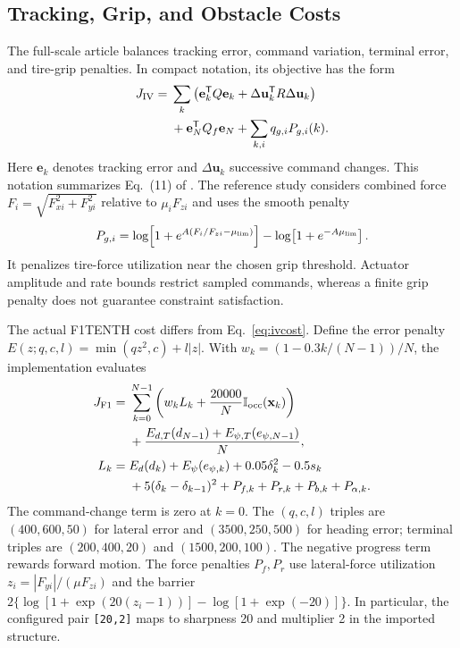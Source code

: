 \subsection{Tracking, Grip, and Obstacle Costs}
The full-scale article balances tracking error, command variation, terminal error, and tire-grip penalties. In compact notation, its objective has the form
\begin{equation}
\begin{aligned}
J_{\rm IV}={}&\sum_k\left(\mathbf e_k^\mathsf TQ\mathbf e_k+
\Delta\mathbf u_k^\mathsf TR\Delta\mathbf u_k\right)\\
&+\mathbf e_N^\mathsf TQ_f\mathbf e_N
 +\sum_{k,i}q_{g,i}P_{g,i}(k).
\end{aligned}\label{eq:ivcost}
\end{equation}
Here $\mathbf e_k$ denotes tracking error and $\Delta\mathbf u_k$ successive command changes. This notation summarizes Eq.~(11) of \cite{muraleedharan2025racing}. The reference study considers combined force $F_i=\sqrt{F_{xi}^2+F_{yi}^2}$ relative to $\mu_iF_{zi}$ and uses the smooth penalty
\begin{equation}
P_{g,i}=\log\!\left[1+e^{A(F_i/F_{zi}-\mu_{\rm lim})}\right]
-\log\!\left[1+e^{-A\mu_{\rm lim}}\right].
\end{equation}
It penalizes tire-force utilization near the chosen grip threshold. Actuator amplitude and rate bounds restrict sampled commands, whereas a finite grip penalty does not guarantee constraint satisfaction.

The actual F1TENTH cost differs from Eq.~\ref{eq:ivcost}. Define the error penalty $E(z;q,c,l)=\min(qz^2,c)+l|z|$. With $w_k=(1-0.3k/(N-1))/N$, the implementation evaluates
\begin{equation}
\begin{aligned}
J_{\rm F1}={}&\sum_{k=0}^{N-1}\left(w_kL_k+
\frac{20000}{N}\mathbb I_{\rm occ}(\mathbf x_k)\right)\\
&+\frac{E_{d,T}(d_{N-1})+E_{\psi,T}(e_{\psi,N-1})}{N},\\
L_k={}&E_d(d_k)+E_\psi(e_{\psi,k})+0.05\delta_k^2-0.5s_k\\
&+5(\delta_k-\delta_{k-1})^2
 +P_{f,k}+P_{r,k}+P_{b,k}+P_{\alpha,k}.
\end{aligned}\label{eq:f1cost}
\end{equation}
The command-change term is zero at $k=0$. The $(q,c,l)$ triples are $(400,600,50)$ for lateral error and $(3500,250,500)$ for heading error; terminal triples are $(200,400,20)$ and $(1500,200,100)$. The negative progress term rewards forward motion. The force penalties $P_f,P_r$ use lateral-force utilization $z_i=|F_{yi}|/(\mu F_{zi})$ and the barrier $2\{\log[1+\exp(20(z_i-1))]-\log[1+\exp(-20)]\}$. In particular, the configured pair \texttt{[20,2]} maps to sharpness 20 and multiplier 2 in the imported structure.

